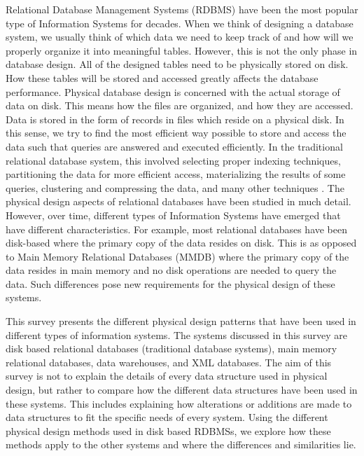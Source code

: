 \documentclass[12pt,a4paper]{article}
\begin{document}
Relational Database Management Systems (RDBMS) have been the most popular type of Information Systems for decades. When we think of designing a database system,
we usually think of which data we need to keep track of and how will we properly organize it into meaningful tables. However, this is not the only phase in
database design. All of the designed tables need to be physically stored on disk. How these tables will be stored and accessed greatly affects the database
performance. Physical database design is concerned with the actual storage of data on disk. This means how the files are organized, and how they are accessed.
Data is stored in the form of records in files which reside on a physical disk. In this sense, we try to find the most efficient way possible to store and
access the data such that queries are answered and executed efficiently. In the traditional relational database system, this involved selecting proper indexing
techniques, partitioning the data for more efficient access, materializing the results of some queries, clustering and compressing the data, and many other
techniques \cite{fikelstein1988physical,lightstone2007physical}. The physical design aspects of relational databases have been studied in much detail. However,
over time, different types of Information Systems have emerged that have different characteristics. For example, most relational databases have been disk-based
where the primary copy of the data resides on disk. This is as opposed to Main Memory Relational Databases (MMDB) where the primary copy of the data resides in
main memory and no disk operations are needed to query the data. Such differences pose new requirements for the physical design of these systems.

This survey presents the different physical design patterns that have been used in different types of information systems. The systems discussed in this survey
are disk based relational databases (traditional database systems), main memory relational databases, data warehouses, and XML databases. The aim of this survey
is not to explain the details of every data structure used in physical design, but rather to compare how the different data structures have been used in these
systems. This includes explaining how alterations or additions are made to data structures to fit the specific needs of every system. Using the different
physical design methods used in disk based RDBMSs, we explore how these methods apply to the other systems and where the differences and similarities lie.
\end{document}
